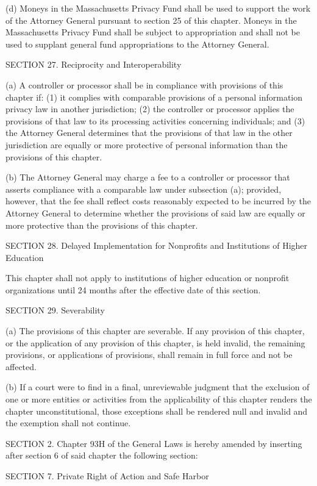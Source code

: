 (d) Moneys in the Massachusetts Privacy Fund shall be used to support the work of the Attorney General pursuant to section 25 of this chapter. Moneys in the Massachusetts Privacy Fund shall be subject to appropriation and shall not be used to supplant general fund appropriations to the Attorney General.

SECTION 27. Reciprocity and Interoperability

(a) A controller or processor shall be in compliance with provisions of this chapter if: (1) it complies with comparable provisions of a personal information privacy law in another jurisdiction; (2) the controller or processor applies the provisions of that law to its processing activities concerning individuals; and (3) the Attorney General determines that the provisions of that law in the other jurisdiction are equally or more protective of personal information than the provisions of this chapter.

(b) The Attorney General may charge a fee to a controller or processor that asserts compliance with a comparable law under subsection (a); provided, however, that the fee shall reflect costs reasonably expected to be incurred by the Attorney General to determine whether the provisions of said law are equally or more protective than the provisions of this chapter.

SECTION 28. Delayed Implementation for Nonprofits and Institutions of Higher Education

This chapter shall not apply to institutions of higher education or nonprofit organizations until 24 months after the effective date of this section.

SECTION 29. Severability

(a) The provisions of this chapter are severable. If any provision of this chapter, or the application of any provision of this chapter, is held invalid, the remaining provisions, or applications of provisions, shall remain in full force and not be affected.

(b) If a court were to find in a final, unreviewable judgment that the exclusion of one or more entities or activities from the applicability of this chapter renders the chapter unconstitutional, those exceptions shall be rendered null and invalid and the exemption shall not continue.

SECTION 2. Chapter 93H of the General Laws is hereby amended by inserting after section 6 of said chapter the following section:

SECTION 7. Private Right of Action and Safe Harbor

